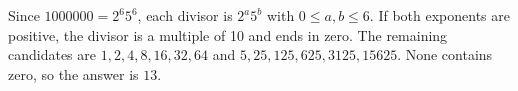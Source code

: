 Since $1000000=2^6 5^6$, each divisor is $2^a 5^b$ with $0\le a,b\le 6$. If both exponents are positive, the divisor is a multiple of 10 and ends in zero. The remaining candidates are $1,2,4,8,16,32,64$ and $5,25,125,625,3125,15625$. None contains zero, so the answer is $\boxed{13}$.
